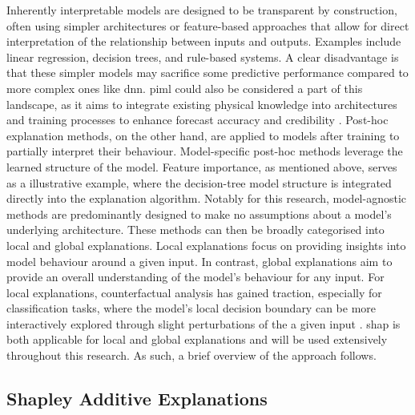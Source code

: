 Inherently interpretable models are designed to be transparent by construction, often using simpler architectures or feature-based approaches that allow for direct interpretation of the relationship between inputs and outputs. Examples include linear regression, decision trees, and rule-based systems. A clear disadvantage is that these simpler models may sacrifice some predictive performance compared to more complex ones like \acrfull{dnn}. \acrshort{piml} could also be considered a part of this landscape, as it aims to integrate existing physical knowledge into architectures and training processes to enhance forecast accuracy and credibility \citep{Luo2025,Pathak2022}. Post-hoc explanation methods, on the other hand, are applied to models after training to partially interpret their behaviour. Model-specific post-hoc methods leverage the learned structure of the model. Feature importance, as mentioned above, serves as a illustrative example, where the decision-tree model structure is integrated directly into the explanation algorithm. Notably for this research, model-agnostic methods are predominantly designed to make no assumptions about a model's underlying architecture. These methods can then be broadly categorised into local and global explanations. Local explanations focus on providing insights into model behaviour around a given input. In contrast, global explanations aim to provide an overall understanding of the model's behaviour for any input. For local explanations, counterfactual analysis has gained traction, especially for classification tasks, where the model's local decision boundary can be more interactively explored through slight perturbations of the a given input \citep{Mothilal2019}. \acrfull{shap} is both applicable for local and global explanations and will be used extensively throughout this research. As such, a brief overview of the approach follows.

\subsection{Shapley Additive Explanations}

